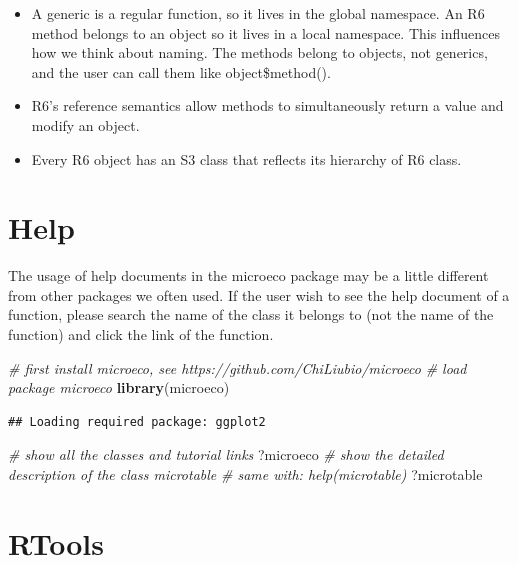 \documentclass[
]{book}
\newenvironment{Shaded}{\begin{snugshade}}{\end{snugshade}}
\newcommand{\CommentTok}[1]{\textcolor[rgb]{0.56,0.35,0.01}{\textit{#1}}}
\newcommand{\FunctionTok}[1]{\textcolor[rgb]{0.13,0.29,0.53}{\textbf{#1}}}
\newcommand{\NormalTok}[1]{#1}
\begin{document}
\begin{itemize}
\item
  A generic is a regular function, so it lives in the global namespace. An R6 method belongs to an object so it lives in a local namespace.
  This influences how we think about naming. The methods belong to objects, not generics, and the user can call them like object\$method().
\item
  R6's reference semantics allow methods to simultaneously return a value and modify an object.
\item
  Every R6 object has an S3 class that reflects its hierarchy of R6 class.
\end{itemize}

\section{Help}\label{help}

The usage of help documents in the microeco package may be a little different from other packages we often used.
If the user wish to see the help document of a function, please search the name of the class it belongs to (not the name of the function)
and click the link of the function.

\begin{Shaded}
\begin{Highlighting}[]
\CommentTok{\# first install microeco, see https://github.com/ChiLiubio/microeco}
\CommentTok{\# load package microeco}
\FunctionTok{library}\NormalTok{(microeco)}
\end{Highlighting}
\end{Shaded}

\begin{verbatim}
## Loading required package: ggplot2
\end{verbatim}

\begin{Shaded}
\begin{Highlighting}[]
\CommentTok{\# show all the classes and tutorial links}
\NormalTok{?microeco}
\CommentTok{\# show the detailed description of the class microtable}
\CommentTok{\# same with: help(microtable)}
\NormalTok{?microtable}
\end{Highlighting}
\end{Shaded}

\section{RTools}\label{rtools}
\end{document}
